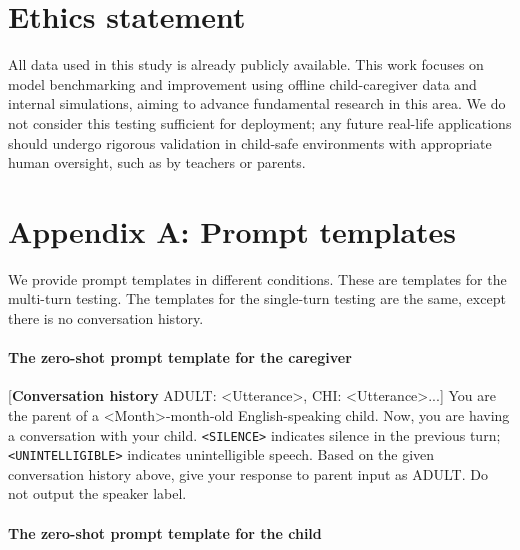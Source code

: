 \section{Ethics statement}
All data used in this study is already publicly available.
This work focuses on model benchmarking and improvement using offline child-caregiver data and internal simulations, aiming to advance fundamental research in this area. We do not consider this testing sufficient for deployment; any future real-life applications should undergo rigorous validation in child-safe environments with appropriate human oversight, such as by teachers or parents.



\setlength{\parskip}{6pt}

\clearpage



\section*{Appendix A: Prompt templates}
\label{sec:prompts}
We provide prompt templates in different conditions. These are templates for the multi-turn testing. The templates for the single-turn testing are the same, except there is no conversation history.


\paragraph{The zero-shot prompt template for the caregiver}


[\textbf{Conversation history} ADULT: \textless Utterance\textgreater, CHI: \textless Utterance\textgreater ...]
You are the parent of a \textless Month\textgreater-month-old English-speaking child. Now, you are having a conversation with your child. \texttt{<SILENCE>} indicates silence in the previous turn; \texttt{<UNINTELLIGIBLE>} indicates unintelligible speech. Based on the given conversation history above, give your response to parent input as ADULT. Do not output the speaker label. 



\paragraph{The zero-shot prompt template for the child}


